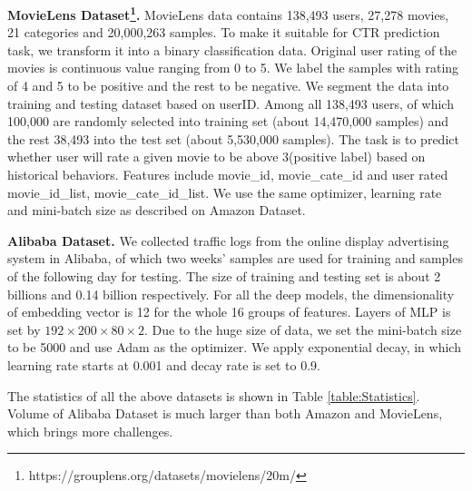     
\textbf{MovieLens Dataset\footnote{https://grouplens.org/datasets/movielens/20m/}.} MovieLens data\cite{MovieLens} contains 138,493 users, 27,278 movies, 21 categories and 20,000,263 samples. To make it suitable for CTR prediction task, we transform it into a binary classification data. Original user rating of the movies is continuous value ranging from 0 to 5. We label the samples with rating of 4 and 5 to be positive and the rest to be negative. We segment the data into training and testing dataset based on userID. Among all 138,493 users, of which 100,000 are randomly selected into training set (about 14,470,000 samples) and the rest 38,493 into the test set (about 5,530,000 samples). The task is to predict whether user will rate a given movie to be above 3(positive label) based on historical behaviors. Features include movie\_id, movie\_cate\_id and user rated movie\_id\_list, movie\_cate\_id\_list. We use the same optimizer, learning rate and mini-batch size as described on Amazon Dataset.

\textbf{Alibaba Dataset.} We collected traffic logs from the online display advertising system in Alibaba, of which two weeks' samples are used for training and  samples of the following day for testing. The size of training and testing set is about 2 billions and 0.14 billion respectively. For all the deep models, the dimensionality of embedding vector is 12 for the whole 16 groups of features. %
Layers of MLP is set by $192 \times 200 \times 80 \times 2$. Due to the huge size of data, we set the mini-batch size to be 5000 and use Adam\cite{Adam} as the optimizer. We apply exponential decay, in which learning rate starts at 0.001 and decay rate is set to 0.9.

The statistics of all the above datasets is shown in Table \ref{table:Statistics}. 
Volume of Alibaba Dataset is much larger than both Amazon and MovieLens, which brings more challenges. 

